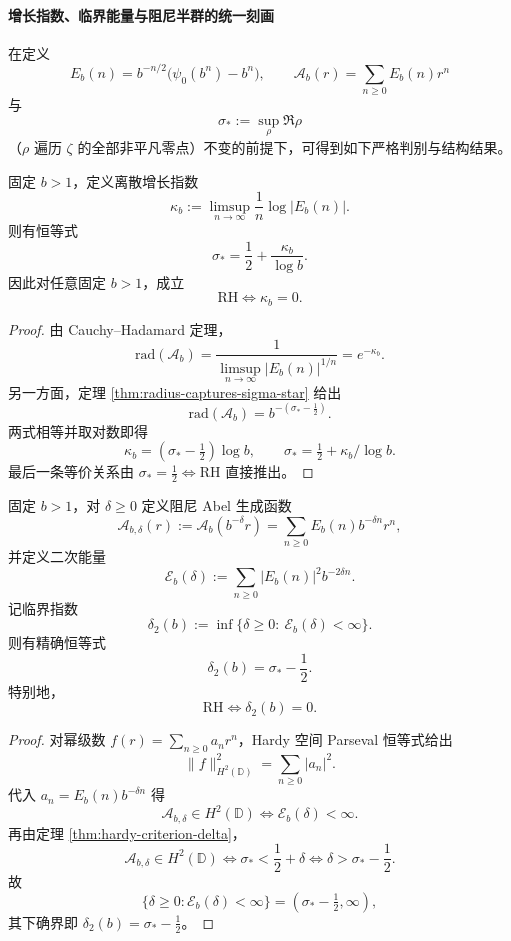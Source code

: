 \paragraph{增长指数、临界能量与阻尼半群的统一刻画}
在定义
\[
E_b(n)=b^{-n/2}\bigl(\psi_0(b^n)-b^n\bigr),\qquad
\mathcal A_b(r)=\sum_{n\ge 0}E_b(n)r^n
\]
与
\[
\sigma_*:=\sup_{\rho}\Re\rho
\]
（\(\rho\) 遍历 \(\zeta\) 的全部非平凡零点）不变的前提下，可得到如下严格判别与结构结果。

\begin{theorem}[右端零点实部的增长指数判别式]\label{thm:abel-growth-exponent-criterion}
固定 \(b>1\)，定义离散增长指数
\[
\kappa_b:=\limsup_{n\to\infty}\frac{1}{n}\log|E_b(n)|.
\]
则有恒等式
\[
\sigma_*=\frac12+\frac{\kappa_b}{\log b}.
\]
因此对任意固定 \(b>1\)，成立
\[
\mathrm{RH}\Longleftrightarrow \kappa_b=0.
\]
\end{theorem}
\begin{proof}
由 Cauchy--Hadamard 定理，
\[
\mathrm{rad}(\mathcal A_b)
=\frac{1}{\limsup_{n\to\infty}|E_b(n)|^{1/n}}
=e^{-\kappa_b}.
\]
另一方面，定理 \ref{thm:radius-captures-sigma-star} 给出
\[
\mathrm{rad}(\mathcal A_b)=b^{-(\sigma_*-\frac12)}.
\]
两式相等并取对数即得
\[
\kappa_b=(\sigma_*-\tfrac12)\log b,\qquad
\sigma_*=\tfrac12+\kappa_b/\log b.
\]
最后一条等价关系由 \(\sigma_*=\tfrac12\iff \mathrm{RH}\) 直接推出。
\end{proof}

\begin{theorem}\label{thm:abel-h2-critical-index}
固定 \(b>1\)，对 \(\delta\ge 0\) 定义阻尼 Abel 生成函数
\[
\mathcal A_{b,\delta}(r):=\mathcal A_b(b^{-\delta}r)
=\sum_{n\ge 0}E_b(n)b^{-\delta n}r^n,
\]
并定义二次能量
\[
\mathcal E_b(\delta):=\sum_{n\ge 0}|E_b(n)|^2b^{-2\delta n}.
\]
记临界指数
\[
\delta_2(b):=\inf\{\delta\ge 0:\ \mathcal E_b(\delta)<\infty\}.
\]
则有精确恒等式
\[
\delta_2(b)=\sigma_*-\frac12.
\]
特别地，
\[
\mathrm{RH}\Longleftrightarrow \delta_2(b)=0.
\]
\end{theorem}
\begin{proof}
对幂级数 \(f(r)=\sum_{n\ge 0}a_nr^n\)，Hardy 空间 Parseval 恒等式给出
\[
\|f\|_{H^2(\mathbb D)}^2=\sum_{n\ge 0}|a_n|^2.
\]
代入 \(a_n=E_b(n)b^{-\delta n}\) 得
\[
\mathcal A_{b,\delta}\in H^2(\mathbb D)
\Longleftrightarrow
\mathcal E_b(\delta)<\infty.
\]
再由定理 \ref{thm:hardy-criterion-delta}，
\[
\mathcal A_{b,\delta}\in H^2(\mathbb D)
\Longleftrightarrow
\sigma_*<\frac12+\delta
\Longleftrightarrow
\delta>\sigma_*-\frac12.
\]
故
\[
\{\delta\ge 0:\mathcal E_b(\delta)<\infty\}
=(\sigma_*-\tfrac12,\infty),
\]
其下确界即 \(\delta_2(b)=\sigma_*-\frac12\)。
\end{proof}

